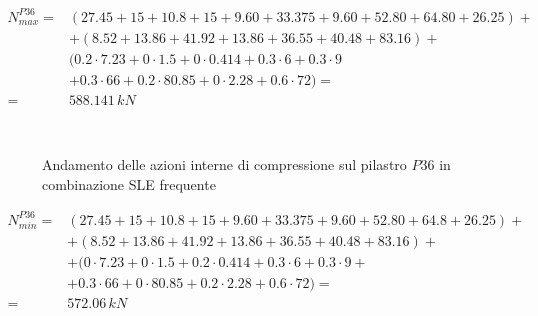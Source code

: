 \begin{align*}
	N_{max}^{P36} =&(27.45 + 15 +10.8 + 15+9.60 + 33.375+9.60+52.80+64.80+26.25)+\\
	&+(8.52+13.86+41.92+13.86+36.55+40.48+83.16)+\\
	&(0.2\cdot7.23+0\cdot1.5+0\cdot0.414+0.3\cdot6+0.3\cdot9\\
	&+0.3\cdot66+0.2\cdot80.85+0\cdot2.28+0.6\cdot72) =\\
	=& 588.141\,kN
\end{align*}

\begin{figure}
	\centering
	\\
	\caption{Andamento delle azioni interne di compressione sul pilastro $P36$ in combinazione SLE frequente}
	\label{fig:P36axialLoad_sleFreq}
\end{figure}

\begin{align*}
	N_{min}^{P36} =& (27.45 + 15+10.8 + 15+9.60 + 33.375+9.60+52.80+64.8+26.25)+\\
	&+(8.52+13.86+41.92+13.86+36.55+40.48+83.16)+\\
	&+(0\cdot7.23+0\cdot1.5+0.2\cdot0.414+0.3\cdot6+0.3\cdot9+\\
	&+0.3\cdot66+0\cdot80.85+0.2\cdot2.28+0.6\cdot72)=\\
	=& 572.06\,kN
\end{align*}

